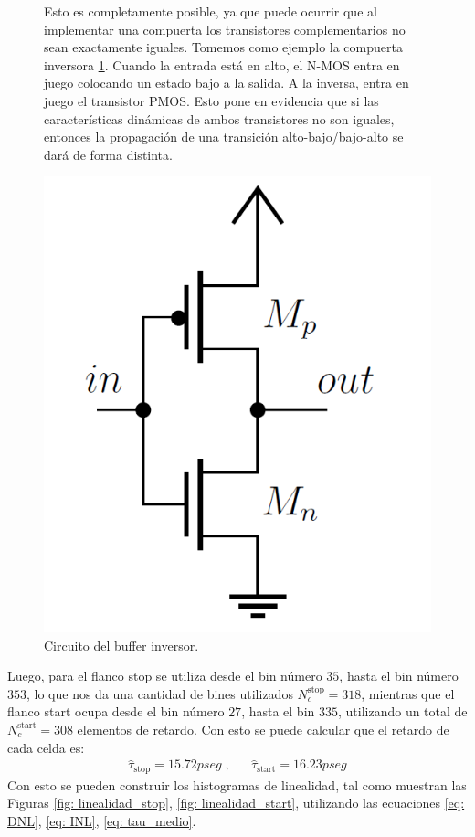 \begin{figure}[h]
     \centering
     \begin{minipage}{0.5\textwidth}
          Esto es completamente posible, ya que puede ocurrir que al implementar una compuerta los transistores complementarios
           no sean exactamente iguales. Tomemos como ejemplo la compuerta inversora \ref{fig: buffer_inversor}. Cuando la entrada está
           en alto, el N-MOS entra en juego colocando un estado bajo a la salida. A la inversa, entra en juego el transistor PMOS. Esto
           pone en evidencia que si las características dinámicas de ambos transistores no son iguales, entonces la propagación de una transición
           alto-bajo/bajo-alto se dará de forma distinta.
      \end{minipage}%
     \begin{minipage}{0.5\textwidth}
         \centering
         \includegraphics[width=0.4\linewidth]{imagenes/buffer_inversor.png}
         \caption{Circuito del buffer inversor.}
         \label{fig: buffer_inversor}
     \end{minipage}     
 \end{figure}

Luego, para el flanco stop se utiliza desde el bin número $35$, hasta el bin número $353$, lo que nos
da una cantidad de bines utilizados $N_c^{\text{stop}} = 318$, mientras que el flanco start
ocupa desde el bin número $27$, hasta el bin $335$, utilizando un total de $N_c^{\text{start}} = 308$
elementos de retardo. Con esto se puede calcular que el retardo de cada celda es:
\begin{align}
     \hat{\tau}_{\text{stop}} = 15.72pseg \; , && \hat{\tau}_{\text{start}} = 16.23pseg
\end{align}
Con esto se pueden construir los histogramas de linealidad, tal como muestran las Figuras \ref{fig: linealidad_stop}, \ref{fig: linealidad_start}, 
utilizando las ecuaciones \ref{eq: DNL}, \ref{eq: INL}, \ref{eq: tau_medio}.

